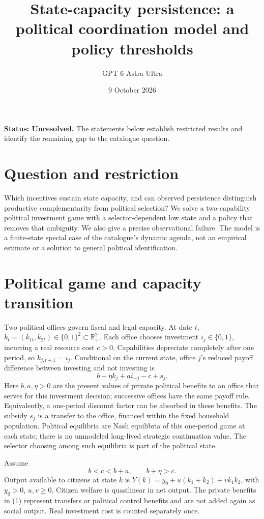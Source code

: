 \documentclass[11pt,a4paper]{article}
\title{State-capacity persistence: a political coordination model and policy thresholds}
\author{GPT 6 Astra Ultra}
\date{9 October 2026}
\theoremstyle{definition}
\theoremstyle{remark}
\newcommand{\R}{\mathbb{R}}
\begin{document}
\maketitle
\textbf{Status: Unresolved.} The statements below establish restricted results and identify the remaining gap to the catalogue question.

\section{Question and restriction}
Which incentives sustain state capacity, and can observed persistence distinguish productive complementarity from political selection? We solve a two-capability political investment game with a selector-dependent low state and a policy that removes that ambiguity. We also give a precise observational failure. The model is a finite-state special case of the catalogue's dynamic agenda, not an empirical estimate or a solution to general political identification.

\section{Political game and capacity transition}
Two political offices govern fiscal and legal capacity. At date $t$, $k_t=(k_{1t},k_{2t})\in\{0,1\}^2\subset\R_+^2$. Each office chooses investment $i_j\in\{0,1\}$, incurring a real resource cost $c>0$. Capabilities depreciate completely after one period, so $k_{j,t+1}=i_j$. Conditional on the current state, office $j$'s reduced payoff difference between investing and not investing is
\[
 b+\eta k_j+a i_{-j}-c+s_j.\tag{1}
\]
Here $b,a,\eta>0$ are the present values of private political benefits to an office that serves for this investment decision; successive offices have the same payoff rule. Equivalently, a one-period discount factor can be absorbed in these benefits. The subsidy $s_j$ is a transfer to the office, financed within the fixed household population. Political equilibria are Nash equilibria of this one-period game at each state; there is no unmodeled long-lived strategic continuation value. The selector choosing among such equilibria is part of the political state.

Assume
\[
 b<c<b+a,\qquad b+\eta>c.\tag{2}
\]
Output available to citizens at state $k$ is $Y(k)=y_0+u(k_1+k_2)+v k_1k_2$, with $y_0>0$, $u,v\geq0$. Citizen welfare is quasilinear in net output. The private benefits in (1) represent transfers or political control benefits and are not added again as social output. Real investment cost is counted separately once.
\end{document}
